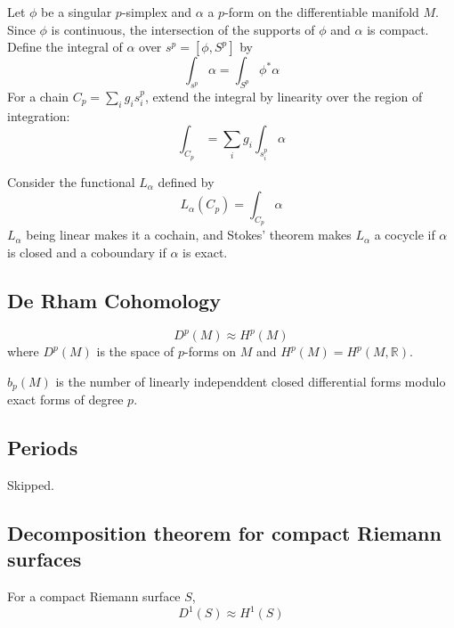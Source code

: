 \begin{defn}

Let $ \phi$ be a singular $p$-simplex and $ \alpha$ a $p$-form on the differentiable manifold $M$. Since $ \phi$ is continuous, the intersection of the supports of $ \phi$ and $ \alpha$ is compact. Define the integral of $ \alpha$ over $s^p = \left[ \phi, S^p \right]$ by 
\[
	\int_{s^p} \alpha = \int_{ S^p } \phi^* \alpha
\]
For a chain $C_p = \sum_i g_i s^p_i$, extend the integral by linearity over the region of integration:
\[
\int_{ C_p } = \sum_i g_i \int_{ s^p_i } \alpha
\]
\end{defn}

\begin{prop}

Consider the functional $L_{ \alpha }$ defined by 
\[
	L_{ \alpha } \left( C_p \right) = \int_{ C_p } \alpha
\]
$L_{ \alpha }$ being linear makes it a cochain, and Stokes' theorem makes $L_{ \alpha }$ a cocycle if $ \alpha$ is closed and a coboundary if $ \alpha$ is exact.

\end{prop}

\subsection{De Rham Cohomology}

\begin{thm}

\[
	D^p(M) \approx H^p(M)
\]
where $D^p(M)$ is the space of $p$-forms on $M$ and $H^p(M) = H^p(M, \mathbb{R})$.

\end{thm}

\begin{thm}

	$b_p(M)$ is the number of linearly independdent closed differential forms modulo exact forms of degree $p$.

\end{thm}

\subsection{Periods}
Skipped.

\subsection{Decomposition theorem for compact Riemann surfaces}

\begin{thm}

For a compact Riemann surface $S$, 
\[
	D^1(S) \approx H^1(S)
\]


\end{thm}


